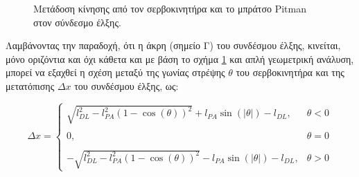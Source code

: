 \bigskip
\begin{figure}[!ht]
	\centering
	\centering
	\caption{Μετάδοση κίνησης από τον σερβοκινητήρα και το μπράτσο Pitman στον σύνδεσμο έλξης.}
	\label{fig:drag_link_analysis}	
\end{figure}

\bigskip
Λαμβάνοντας την παραδοχή, ότι η άκρη (σημείο Γ) του συνδέσμου έλξης, κινείται, μόνο οριζόντια και όχι κάθετα και με βάση το σχήμα \ref{fig:drag_link_analysis} και απλή γεωμετρική ανάλυση, μπορεί να εξαχθεί η  σχέση μεταξύ της γωνίας στρέψης $\theta$ του σερβοκινητήρα και της μετατόπισης $\Delta x$ του {συνδέσμου έλξης}, ως:

\begin{equation}
	\label{eq:drag_link_displacement}
	\Delta x =
	\begin{cases}
		\sqrt{l_{DL}^2 - l_{PA}^2(1-\cos(\theta))^2} + l_{PA} \sin(|\theta|) - l_{DL},  &\theta < 0\\ \\
	0, &\theta = 0\\ \\ 
	-\sqrt{l_{DL}^2 - l_{PA}^2(1-\cos(\theta))^2} - l_{PA} \sin(|\theta|) - l_{DL}, &\theta > 0
	\end{cases}
\end{equation}

